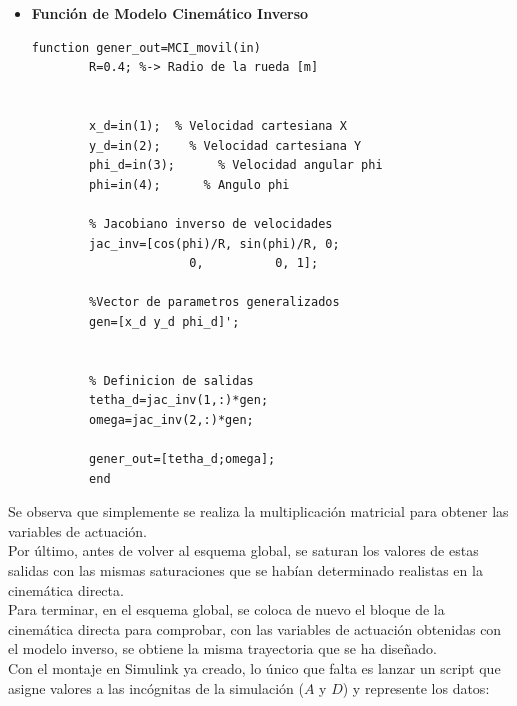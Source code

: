 \documentclass[a4paper,twoside]{article}
\begin{document}
	\begin{itemize}
		\item \textbf{Función de Modelo Cinemático Inverso} 
		\lstset{language=Matlab,columns=flexible,keepspaces=true}
		
		\begin{lstlisting}[frame=single]
		function gener_out=MCI_movil(in)
		R=0.4; %-> Radio de la rueda [m]
		
		
		x_d=in(1);  % Velocidad cartesiana X
		y_d=in(2);    % Velocidad cartesiana Y
		phi_d=in(3);      % Velocidad angular phi
		phi=in(4);      % Angulo phi
		
		% Jacobiano inverso de velocidades
		jac_inv=[cos(phi)/R, sin(phi)/R, 0;
			          0,          0, 1];
		
		%Vector de parametros generalizados
		gen=[x_d y_d phi_d]';
		
		
		% Definicion de salidas
		tetha_d=jac_inv(1,:)*gen;
		omega=jac_inv(2,:)*gen;
		
		gener_out=[tetha_d;omega];
		end
		\end{lstlisting} 
	\end{itemize}

	Se observa que simplemente se realiza la multiplicación matricial para obtener las variables de actuación.\\
	
	Por último, antes de volver al esquema global, se saturan los valores de estas salidas con las mismas saturaciones que se habían determinado realistas en la cinemática directa.\\
	
	Para terminar, en el esquema global, se coloca de nuevo el bloque de la cinemática directa para comprobar, con las variables de actuación obtenidas con el modelo inverso, se obtiene la misma trayectoria que se ha diseñado.\\
	
	Con el montaje en Simulink ya creado, lo único que falta es lanzar un script que asigne valores a las incógnitas de la simulación ($A$ y $D$) y represente los datos:
	
\end{document}

